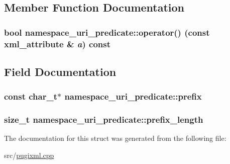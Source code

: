 \subsection{Member Function Documentation}
\hypertarget{structnamespace__uri__predicate_ab4580e45d603d3eedfe75fec74210ce1}{
\subsubsection[{operator()}]{\setlength{\rightskip}{0pt plus 5cm}bool namespace\_\-uri\_\-predicate::operator() (const xml\_\-attribute \& {\em a}) const}}
\label{structnamespace__uri__predicate_ab4580e45d603d3eedfe75fec74210ce1}


\subsection{Field Documentation}
\hypertarget{structnamespace__uri__predicate_a80a2c051b9e57b8895c28d8fcc32e051}{
\subsubsection[{prefix}]{\setlength{\rightskip}{0pt plus 5cm}const char\_\-t$\ast$ {\bf namespace\_\-uri\_\-predicate::prefix}}}
\label{structnamespace__uri__predicate_a80a2c051b9e57b8895c28d8fcc32e051}
\hypertarget{structnamespace__uri__predicate_aa48279192e8d48b9c798f5485a2a9170}{
\subsubsection[{prefix\_\-length}]{\setlength{\rightskip}{0pt plus 5cm}size\_\-t {\bf namespace\_\-uri\_\-predicate::prefix\_\-length}}}
\label{structnamespace__uri__predicate_aa48279192e8d48b9c798f5485a2a9170}


The documentation for this struct was generated from the following file:\begin{DoxyCompactItemize}
\item 
src/\hyperlink{pugixml_8cpp}{pugixml.cpp}\end{DoxyCompactItemize}

